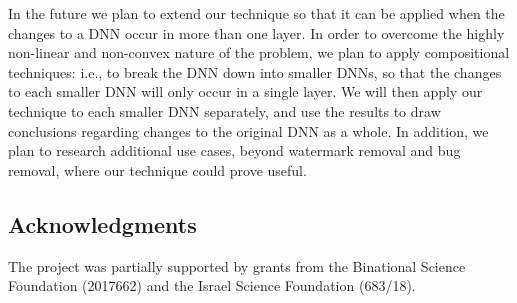 \documentclass{easychair}
\newcommand{\guy}[1]{\marginpar{\textcolor{orange}{Guy: #1}}}
\begin{document}
In the future we plan to extend our technique so that it can be
applied when the changes to a DNN occur in more than one layer. In
order to overcome the highly non-linear and non-convex nature of the
problem, we plan to apply compositional techniques: i.e., to break the DNN
down into smaller DNNs, so that the changes to each smaller DNN will only occur in
a single layer. We will then apply our technique to each smaller DNN
separately, and use the results to draw conclusions regarding changes
to the original DNN as a whole. In addition, we plan to research additional
use cases, beyond watermark removal and bug removal, where our technique
could prove useful.

\subsection*{Acknowledgments}
The project was partially supported by grants from the Binational Science
Foundation (2017662) and the Israel Science Foundation (683/18).

\guy{TODO: Ask the Yossis for additional acks}



\end{document}
